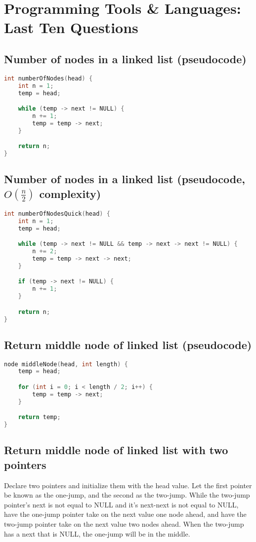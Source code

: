 \documentclass[12pt]{article}
\begin{document}
	\section{Programming Tools \& Languages: Last Ten Questions}
	\subsection{Number of nodes in a linked list (pseudocode)}
	\begin{lstlisting}[language = C, tabsize = 8]
int numberOfNodes(head) {
	int n = 1;
	temp = head;

	while (temp -> next != NULL) {
		n += 1;
		temp = temp -> next;
	}

	return n;
}
	\end{lstlisting}

	\subsection{Number of nodes in a linked list (pseudocode, $O(\frac{n}{2})$ complexity)}
	\begin{lstlisting}[language = C, tabsize = 8]
int numberOfNodesQuick(head) {
	int n = 1;
	temp = head;

	while (temp -> next != NULL && temp -> next -> next != NULL) {
		n += 2;
		temp = temp -> next -> next;
	}

	if (temp -> next != NULL) {
		n += 1;
	}

	return n;
}
	\end{lstlisting}

	\subsection{Return middle node of linked list (pseudocode)}
	\begin{lstlisting}[language = C, tabsize = 8]
node middleNode(head, int length) {
	temp = head;

	for (int i = 0; i < length / 2; i++) {
		temp = temp -> next;
	}

	return temp;
}
	\end{lstlisting}

	\subsection{Return middle node of linked list with two pointers}
	Declare two pointers and initialize them with the head value. Let the first pointer be known as the one-jump, and the second as the two-jump. While the two-jump pointer's next is not equal to NULL and it's next-next is not equal to NULL, have the one-jump pointer take on the next value one node ahead, and have the two-jump pointer take on the next value two nodes ahead. When the two-jump has a next that is NULL, the one-jump will be in the middle. \linebreak
\end{document}
